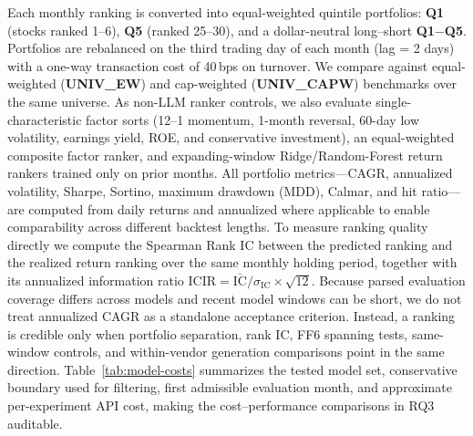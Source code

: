 Each monthly ranking is converted into equal-weighted quintile portfolios: \textbf{Q1} (stocks ranked 1--6), \textbf{Q5} (ranked 25--30), and a dollar-neutral long--short \textbf{Q1$-$Q5}.
Portfolios are rebalanced on the third trading day of each month (lag = 2 days) with a one-way transaction cost of 40\,bps on turnover.
We compare against equal-weighted (\textbf{UNIV\_EW}) and cap-weighted (\textbf{UNIV\_CAPW}) benchmarks over the same universe.
As non-LLM ranker controls, we also evaluate single-characteristic factor sorts (12--1 momentum, 1-month reversal, 60-day low volatility, earnings yield, ROE, and conservative investment), an equal-weighted composite factor ranker, and expanding-window Ridge/Random-Forest return rankers trained only on prior months.
All portfolio metrics---CAGR, annualized volatility, Sharpe, Sortino, maximum drawdown (MDD), Calmar, and hit ratio---are computed from daily returns and annualized where applicable to enable comparability across different backtest lengths.
To measure ranking quality directly we compute the Spearman Rank IC between the predicted ranking and the realized return ranking over the same monthly holding period, together with its annualized information ratio $\text{ICIR} = \bar{\text{IC}}/\sigma_{\text{IC}} \times \sqrt{12}$.
Because parsed evaluation coverage differs across models and recent model windows can be short, we do not treat annualized CAGR as a standalone acceptance criterion.
Instead, a ranking is credible only when portfolio separation, rank IC, FF6 spanning tests, same-window controls, and within-vendor generation comparisons point in the same direction.
Table~\ref{tab:model-costs} summarizes the tested model set, conservative boundary used for filtering, first admissible evaluation month, and approximate per-experiment API cost, making the cost--performance comparisons in RQ3 auditable.

